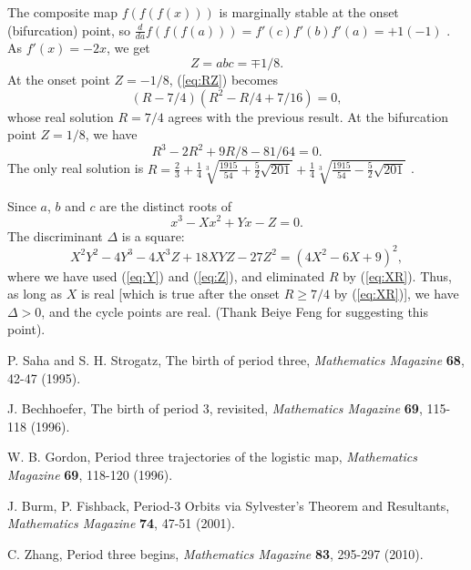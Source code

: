 \documentclass[twocolumn,prl]{revtex4-1}
\begin{document}
The composite map $f(f(f(x)))$ is marginally stable
at the onset (bifurcation) point, so
$\frac{d}{da}f(f(f(a))) = f'(c)f'(b)f'(a) = +1 (-1)$
\cite{saha}.
As $f'(x) = -2x$, we get
\begin{equation}
  Z = a b c = \mp1/8.
\label{eq:Zder}
\end{equation}
%
At the onset point $Z = -1/8$, (\ref{eq:RZ}) becomes
\[
  (R-7/4) (R^2 - R/4 + 7/16) = 0,
\]
whose real solution $R = 7/4$ agrees with the previous result.
%
At the bifurcation point $Z = 1/8$, we have
\[
  R^3 - 2 R^2 + 9R/8 - 81/64 = 0.
\]
The only real solution is
$R = \frac{2}{3}
  +\frac{1}{4} \sqrt[3]{ \frac{1915}{54} + \frac{5}{2} \sqrt{201}}
  +\frac{1}{4} \sqrt[3]{ \frac{1915}{54} - \frac{5}{2} \sqrt{201}}$
\cite{gordon, burm}.

Since $a$, $b$ and $c$ are the distinct roots of
\[
  x^3 - X x^2 + Y x - Z = 0.
\]
The discriminant $\Delta$ is a square:
\[
X^2 Y^2 - 4 Y^3 - 4 X^3 Z + 18 X Y Z - 27 Z^2
  = (4X^2 - 6X + 9)^2,
\]
where we have used (\ref{eq:Y}) and (\ref{eq:Z}),
and eliminated $R$ by (\ref{eq:XR}).
Thus, as long as $X$ is real
[which is true after the onset $R \ge 7/4$ by (\ref{eq:XR})],
we have $\Delta > 0$, and the cycle points are real.
(Thank Beiye Feng for suggesting this point).

\begin{thebibliography}{}

 P. Saha and S. H. Strogatz,
  The birth of period three,
  \textit{Mathematics Magazine}
  \textbf{68},
  42-47
  (1995).

 J. Bechhoefer,
  The birth of period 3, revisited,
  \textit{Mathematics Magazine}
  \textbf{69},
  115-118
  (1996).

 W. B. Gordon,
  Period three trajectories of the logistic map,
  \textit{Mathematics Magazine}
  \textbf{69},
  118-120
  (1996).

 J. Burm, P. Fishback,
  Period-3 Orbits via Sylvester's Theorem and Resultants,
  \textit{Mathematics Magazine}
  \textbf{74},
  47-51
  (2001).

 C. Zhang,
  Period three begins,
  \textit{Mathematics Magazine}
  \textbf{83},
  295-297
  (2010).

\end{thebibliography}
\end{document}

